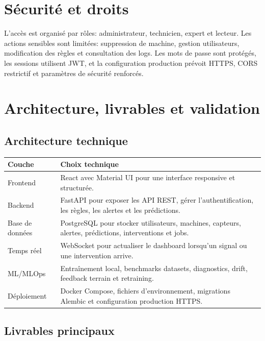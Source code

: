 \documentclass[10pt,a4paper]{article}
\begin{document}
\section{Sécurité et droits}

L'accès est organisé par rôles: administrateur, technicien, expert et lecteur.
Les actions sensibles sont limitées: suppression de machine, gestion utilisateurs, modification des règles et consultation des logs.
Les mots de passe sont protégés, les sessions utilisent JWT, et la configuration production prévoit HTTPS, CORS restrictif et paramètres de sécurité renforcés.

\newpage

\section{Architecture, livrables et validation}

\subsection{Architecture technique}

\begin{tabularx}{\textwidth}{p{3.2cm}Y}
\toprule
{}
\textbf{Couche} & \textbf{Choix technique} \\
\midrule
Frontend & React avec Material UI pour une interface responsive et structurée. \\
Backend & FastAPI pour exposer les API REST, gérer l'authentification, les règles, les alertes et les prédictions. \\
Base de données & PostgreSQL pour stocker utilisateurs, machines, capteurs, alertes, prédictions, interventions et jobs. \\
Temps réel & WebSocket pour actualiser le dashboard lorsqu'un signal ou une intervention arrive. \\
ML/MLOps & Entraînement local, benchmarks datasets, diagnostics, drift, feedback terrain et retraining. \\
Déploiement & Docker Compose, fichiers d'environnement, migrations Alembic et configuration production HTTPS. \\
\bottomrule
\end{tabularx}

\subsection{Livrables principaux}
\end{document}
